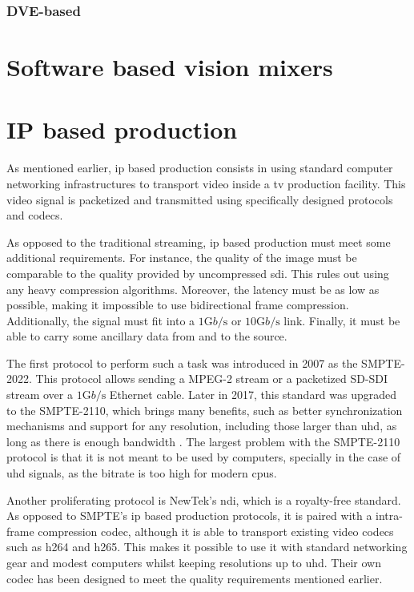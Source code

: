 \documentclass[../main.tex]{subfiles}
\begin{document}
\subsubsection{DVE-based}




\section{Software based vision mixers}


\section{IP based production}
As mentioned earlier, \gls{ip} based production consists in using standard computer networking infrastructures to transport video inside a \gls{tv} production facility. This video signal is packetized and transmitted using specifically designed protocols and codecs.\newline

As opposed to the traditional streaming, \gls{ip} based production must meet some additional requirements. For instance, the quality of the image must be comparable to the quality provided by uncompressed \gls{sdi}. This rules out using any heavy compression algorithms. Moreover, the latency must be as low as possible, making it impossible to use bidirectional frame compression. Additionally, the signal must fit into a $1 \si{\giga b \per\second}$ or $10 \si{\giga b \per\second}$ link. Finally, it must be able to carry some ancillary data from and to the source.\newline

The first protocol to perform such a task was introduced in 2007 as the SMPTE-2022. This protocol allows sending a MPEG-2 stream or a packetized SD-SDI stream over a $1 \si{\giga b \per \second}$ Ethernet cable\cite{tmIpProduction}. Later in 2017, this standard was upgraded to the SMPTE-2110, which brings many benefits, such as better synchronization mechanisms and support for any resolution, including those larger than \gls{uhd}, as long as there is enough bandwidth \cite{smpte2110faq}. The largest problem with the SMPTE-2110 protocol is that it is not meant to be used by computers, specially in the case of \gls{uhd} signals, as the bitrate is too high for modern \glspl{cpu}.\newline

Another proliferating protocol is NewTek's \gls{ndi}, which is a royalty-free standard. As opposed to SMPTE's \gls{ip} based production protocols, it is paired with a intra-frame compression codec, although it is able to transport existing video codecs such as h264 and h265. This makes it possible to use it with standard networking gear and modest computers whilst keeping resolutions up to \gls{uhd}. Their own codec has been designed to meet the quality requirements mentioned earlier.
\end{document}
